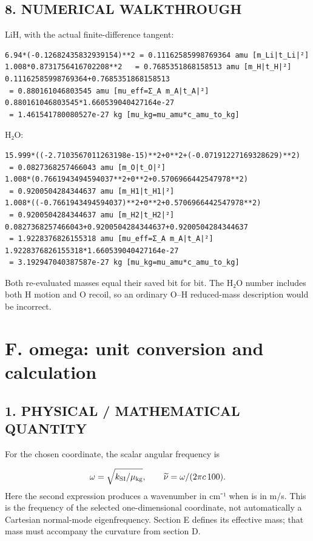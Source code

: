 \documentclass[10pt,a4paper]{article}
\begin{document}
\subsection{8. NUMERICAL WALKTHROUGH}
LiH, with the actual finite-difference tangent:

\begin{Verbatim}
6.94*(-0.12682435832939154)**2 = 0.11162585998769364 amu [m_Li|t_Li|²]
1.008*0.8731756416702208**2   = 0.7685351868158513 amu [m_H|t_H|²]
0.11162585998769364+0.7685351868158513
 = 0.880161046803545 amu [mu_eff=Σ_A m_A|t_A|²]
0.880161046803545*1.660539040427164e-27
 = 1.461541780080527e-27 kg [mu_kg=mu_amu*c_amu_to_kg]
\end{Verbatim}
H₂O:

\begin{Verbatim}
15.999*((-2.7103567011263198e-15)**2+0**2+(-0.07191227169328629)**2)
 = 0.0827368257466043 amu [m_O|t_O|²]
1.008*(0.7661943494594037**2+0**2+0.5706966442547978**2)
 = 0.9200504284344637 amu [m_H1|t_H1|²]
1.008*((-0.7661943494594037)**2+0**2+0.5706966442547978**2)
 = 0.9200504284344637 amu [m_H2|t_H2|²]
0.0827368257466043+0.9200504284344637+0.9200504284344637
 = 1.9228376826155318 amu [mu_eff=Σ_A m_A|t_A|²]
1.9228376826155318*1.660539040427164e-27
 = 3.192947040387587e-27 kg [mu_kg=mu_amu*c_amu_to_kg]
\end{Verbatim}
Both re-evaluated masses equal their saved  bit for bit. The H₂O number includes both H motion and O recoil, so an ordinary O–H reduced-mass description would be incorrect.

\clearpage
\section{F. omega: unit conversion and calculation}
\subsection{1. PHYSICAL / MATHEMATICAL QUANTITY}
For the chosen coordinate, the scalar angular frequency is

\[
\omega=\sqrt{k_{\rm SI}/\mu_{\rm kg}},\qquad
\widetilde\nu=\omega/(2\pi c\,100).
\]
Here the second expression produces a wavenumber in cm⁻¹ when  is in m/s. This is the frequency of the selected one-dimensional coordinate, not automatically a Cartesian normal-mode eigenfrequency. Section E defines its effective mass; that mass must accompany the curvature from section D.
\end{document}
